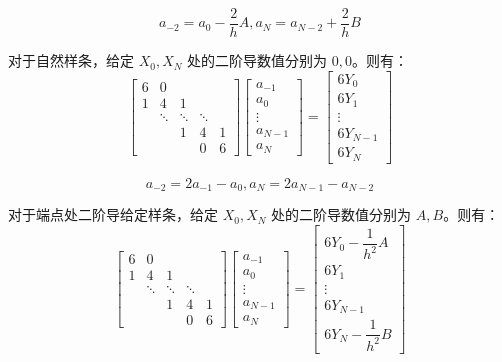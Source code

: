 \documentclass[lang=cn,a4paper,newtx,bibend=bibtex]{elegantpaper}
\begin{document}
\[a_{-2} = a_0 - \dfrac2h A, a_N = a_{N-2} + \dfrac2h B\]

对于自然样条，给定 $X_0, X_N$ 处的二阶导数值分别为 $0, 0$。则有：
\[
  \begin{bmatrix}
    6 & 0 &   &  & \\
    1 & 4 & 1 &  & \\
     & \ddots & \ddots &\ddots & \\
    & & 1 & 4 & 1 \\
    & & & 0 & 6
  \end{bmatrix}
  \begin{bmatrix}
    a_{-1} \\
    a_{0} \\
    \vdots \\
    a_{N-1} \\
    a_{N}
  \end{bmatrix}
   = 
  \begin{bmatrix}
    6Y_0\\
    6Y_1 \\
    \vdots \\
    6Y_{N-1} \\
    6Y_N
  \end{bmatrix}
\]

\[a_{-2} = 2a_{-1} - a_{0}, a_N = 2a_{N-1} - a_{N-2}\]

对于端点处二阶导给定样条，给定 $X_0, X_N$ 处的二阶导数值分别为 $A, B$。则有：
\[
  \begin{bmatrix}
    6 & 0 &   &  & \\
    1 & 4 & 1 &  & \\
     & \ddots & \ddots &\ddots & \\
    & & 1 & 4 & 1 \\
    & & & 0 & 6
  \end{bmatrix}
  \begin{bmatrix}
    a_{-1} \\
    a_{0} \\
    \vdots \\
    a_{N-1} \\
    a_{N}
  \end{bmatrix}
   = 
   \begin{bmatrix}
    6Y_0 - \dfrac1{h^2}A\\
    6Y_1 \\
    \vdots \\
    6Y_{N-1} \\
    6Y_N - \dfrac1{h^2}B
  \end{bmatrix}
\]
\end{document}
